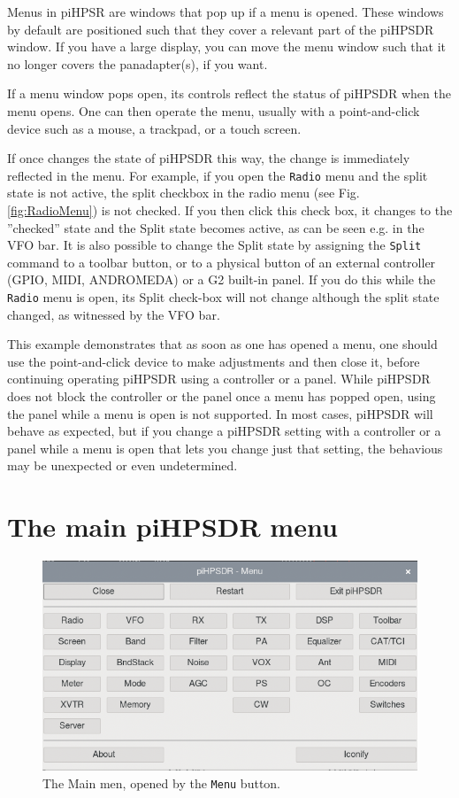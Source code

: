 \documentclass[12pt]{book}
\def\rett#1{\texttt{\color{red}#1}}
\def\bltt#1{\texttt{\color{blue}#1}}
\def\pH{pi\-HPSDR\xspace}
\begin{document}
Menus in piHPSR are windows that pop up if a menu is opened. These windows by default are positioned such
that they cover a relevant part of the \pH window. If you have a large display, you can move the menu
window such that it no longer covers the panadapter(s), if you want.

If a menu window pops open, its controls reflect the status of \pH when the menu opens. One can then operate
the menu, usually with a point-and-click device such as a mouse, a trackpad, or a touch screen.

If once changes the state of \pH this way, the change is immediately reflected in the menu. For example,
if you open the \bltt{Radio} menu and the split state is not active, the split checkbox in the radio
menu (see Fig. \ref{fig:RadioMenu}) is not checked. If you then click this check box, it changes to
the ''checked'' state and the Split state becomes active, as can be seen e.g. in the VFO bar. It is also
possible to change the Split state by assigning the \texttt{Split} command to a toolbar button, or to
a physical button of an external controller (GPIO, MIDI, ANDROMEDA) or a G2 built-in panel. If you do this
while the \bltt{Radio} menu is open, its Split check-box will not change although the split state changed,
as witnessed by the VFO bar.

This example demonstrates that as soon as one has opened a menu, one should use the point-and-click device
to make adjustments and then close it, before continuing operating \pH using a controller or a panel. While
\pH does not block the controller or the panel once a menu has popped open, using the panel while a menu
is open is not supported. In most cases, \pH will behave as expected, but
if you change a \pH setting with a controller or a panel while a menu is open that lets you change just
that setting, the behavious may be unexpected or even undetermined.

\section{The main \pH menu}
\begin{figure}[ht]
\center
\includegraphics[scale=0.45]{MainMenu.png}
\caption{The Main men, opened by the \rett{Menu} button.}
\label{fig:MainMenu}
\end{figure}
\end{document}
